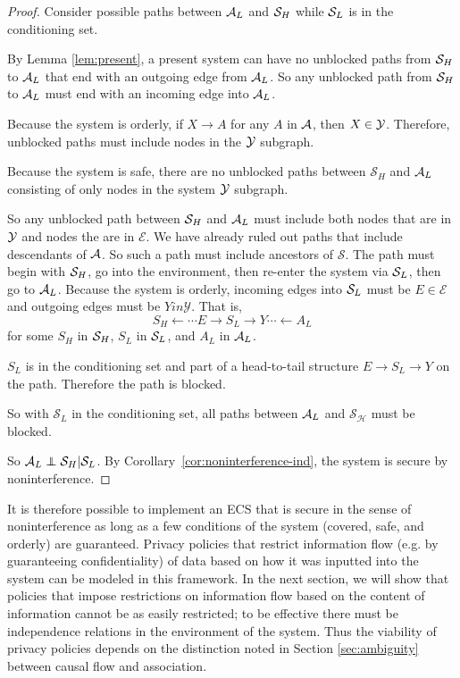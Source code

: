 \documentclass[../thesis.tex]{subfiles}
\begin{document}
\begin{proof}
  Consider possible paths between $\mathcal{A}_L$ and $\mathcal{S}_H$
  while $\mathcal{S}_L$ is in the conditioning set.

  By Lemma \ref{lem:present}, a present system
  can have no unblocked paths from $\mathcal{S}_H$ to $\mathcal{A}_L$
  that end with an outgoing edge from $\mathcal{A}_L$.
  So any unblocked path from $\mathcal{S}_H$ to $\mathcal{A}_L$ must
  end with an incoming edge into $\mathcal{A}_L$.

  Because the system is orderly,
  if $X \rightarrow A$ for any $A$ in $\mathcal{A}$, then $X \in \mathcal{Y}$.
  Therefore, unblocked paths must include nodes
  in the $\mathcal{Y}$ subgraph.
  
  Because the system is safe, there are no unblocked paths
  between $\mathcal{S}_H$ and $\mathcal{A}_L$ consisting of 
  only nodes in the system $\mathcal{Y}$ subgraph.

  So any unblocked path between $\mathcal{S}_H$ and $\mathcal{A}_L$ must include
  both nodes that are in $\mathcal{Y}$ and nodes the are in $\mathcal{E}$.
  We have already ruled out paths that include descendants
  of $\mathcal{A}$.
  So such a path must include ancestors of $\mathcal{S}$.
  The path must begin with $\mathcal{S}_H$, go into the environment,
  then re-enter the system via $\mathcal{S}_L$, then go to $\mathcal{A}_L$.
  Because the system is orderly, incoming edges into $\mathcal{S}_L$
  must be $E \in \mathcal{E}$ and outgoing edges must be
  $Y in \mathcal{Y}$.
  That is,
  $$S_H \leftarrow \cdots E \rightarrow S_L \rightarrow Y \cdots \leftarrow A_L$$
  for some $S_H$ in $\mathcal{S}_H$, $S_L$ in $\mathcal{S}_L$, and $A_L$ in $\mathcal{A}_L$.

  $S_L$ is in the conditioning set and part of a head-to-tail
  structure $E \rightarrow S_L \rightarrow Y$ on the path.
  Therefore the path is blocked.
  
  So with $\mathcal{S}_L$ in the conditioning set,
  all paths between
  $\mathcal{A}_L$ and $\mathcal{S_H}$ must be
  blocked.

  So $\A_L \independent \mc{S}_H \vert \mc{S}_L$.
  By Corollary~\ref{cor:noninterference-ind},
  the system is secure by noninterference.
\end{proof}

It is therefore possible to implement an ECS that is
secure in the sense of noninterference
as long as a few conditions of the system
(covered, safe, and orderly) are guaranteed.
Privacy policies that restrict information flow
(e.g. by guaranteeing confidentiality) of data
based on how it was inputted into the system can
be modeled in this framework.
In the next section, we will show that policies
that impose restrictions on information flow
based on the content of information cannot be
as easily restricted; to be effective there
must be independence relations in the environment
of the system.
Thus the viability of privacy policies depends
on the distinction noted in Section \ref{sec:ambiguity}
between causal flow and association.
\end{document}
